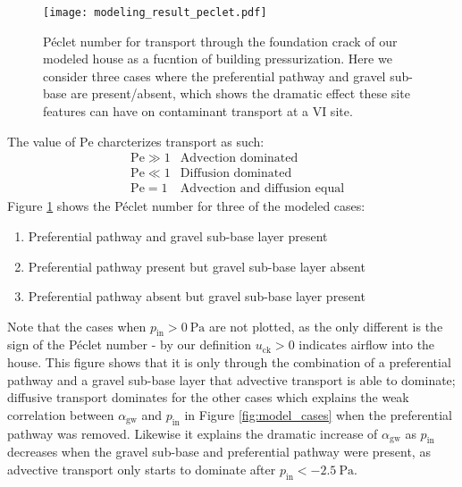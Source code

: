 \begin{figure}[htb!]
  \centering
  \texttt{[image: modeling\_result\_peclet.pdf]}
  \caption{Péclet number for transport through the foundation crack of our modeled house as a fucntion of building pressurization. Here we consider three cases where the preferential pathway and gravel sub-base are present/absent, which shows the dramatic effect these site features can have on contaminant transport at a VI site.}
  \label{fig:peclet_number}
\end{figure}

The value of $\mathrm{Pe}$ charcterizes transport as such:
\begin{align*}
  &\mathrm{Pe} \gg 1 & \text{Advection dominated} \\
  &\mathrm{Pe} \ll 1 & \text{Diffusion dominated} \\
  &\mathrm{Pe} = 1 & \text{Advection and diffusion equal}
\end{align*}
Figure \ref{fig:peclet_number} shows the Péclet number for three of the modeled cases:
\begin{enumerate}
  \item Preferential pathway and gravel sub-base layer present
  \item Preferential pathway present but gravel sub-base layer absent
  \item Preferential pathway absent but gravel sub-base layer present
\end{enumerate}
Note that the cases when $p_\mathrm{in} > \SI{0}{\pascal}$ are not plotted, as the only different is the sign of the Péclet number - by our definition $u_\mathrm{ck} > 0$ indicates airflow into the house.
This figure shows that it is only through the combination of a preferential pathway and a gravel sub-base layer that advective transport is able to dominate; diffusive transport dominates for the other cases which explains the weak correlation between $\alpha_\mathrm{gw}$ and $p_\mathrm{in}$ in Figure \ref{fig:model_cases} when the preferential pathway was removed.
Likewise it explains the dramatic increase of $\alpha_\mathrm{gw}$ as $p_\mathrm{in}$ decreases when the  gravel sub-base and preferential pathway were present, as advective transport only starts to dominate after $p_\mathrm{in} < \SI{-2.5}{\pascal}$.\par


